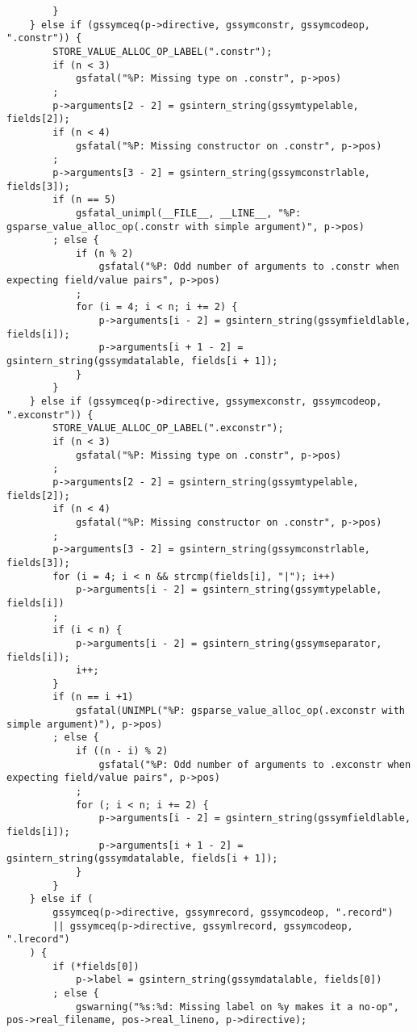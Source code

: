 \documentclass{report}
\begin{document}
\begin{verbatim}
        }
    } else if (gssymceq(p->directive, gssymconstr, gssymcodeop, ".constr")) {
        STORE_VALUE_ALLOC_OP_LABEL(".constr");
        if (n < 3)
            gsfatal("%P: Missing type on .constr", p->pos)
        ;
        p->arguments[2 - 2] = gsintern_string(gssymtypelable, fields[2]);
        if (n < 4)
            gsfatal("%P: Missing constructor on .constr", p->pos)
        ;
        p->arguments[3 - 2] = gsintern_string(gssymconstrlable, fields[3]);
        if (n == 5)
            gsfatal_unimpl(__FILE__, __LINE__, "%P: gsparse_value_alloc_op(.constr with simple argument)", p->pos)
        ; else {
            if (n % 2)
                gsfatal("%P: Odd number of arguments to .constr when expecting field/value pairs", p->pos)
            ;
            for (i = 4; i < n; i += 2) {
                p->arguments[i - 2] = gsintern_string(gssymfieldlable, fields[i]);
                p->arguments[i + 1 - 2] = gsintern_string(gssymdatalable, fields[i + 1]);
            }
        }
    } else if (gssymceq(p->directive, gssymexconstr, gssymcodeop, ".exconstr")) {
        STORE_VALUE_ALLOC_OP_LABEL(".exconstr");
        if (n < 3)
            gsfatal("%P: Missing type on .constr", p->pos)
        ;
        p->arguments[2 - 2] = gsintern_string(gssymtypelable, fields[2]);
        if (n < 4)
            gsfatal("%P: Missing constructor on .constr", p->pos)
        ;
        p->arguments[3 - 2] = gsintern_string(gssymconstrlable, fields[3]);
        for (i = 4; i < n && strcmp(fields[i], "|"); i++)
            p->arguments[i - 2] = gsintern_string(gssymtypelable, fields[i])
        ;
        if (i < n) {
            p->arguments[i - 2] = gsintern_string(gssymseparator, fields[i]);
            i++;
        }
        if (n == i +1)
            gsfatal(UNIMPL("%P: gsparse_value_alloc_op(.exconstr with simple argument)"), p->pos)
        ; else {
            if ((n - i) % 2)
                gsfatal("%P: Odd number of arguments to .exconstr when expecting field/value pairs", p->pos)
            ;
            for (; i < n; i += 2) {
                p->arguments[i - 2] = gsintern_string(gssymfieldlable, fields[i]);
                p->arguments[i + 1 - 2] = gsintern_string(gssymdatalable, fields[i + 1]);
            }
        }
    } else if (
        gssymceq(p->directive, gssymrecord, gssymcodeop, ".record")
        || gssymceq(p->directive, gssymlrecord, gssymcodeop, ".lrecord")
    ) {
        if (*fields[0])
            p->label = gsintern_string(gssymdatalable, fields[0])
        ; else {
            gswarning("%s:%d: Missing label on %y makes it a no-op", pos->real_filename, pos->real_lineno, p->directive);

\end{verbatim}
\end{document}
